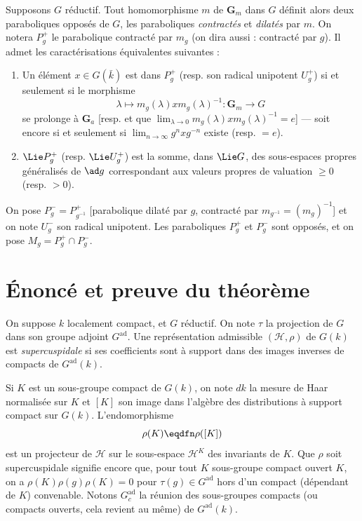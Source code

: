 Supposons \(G\) réductif. Tout homomorphisme \(m\) de \(\mathbf{G}_m\) dans
\(G\) définit alors deux paraboliques opposés de \(G\), les paraboliques
\emph{contractés} et \emph{dilatés} par \(m\). On notera \(P_g^{+}\) le
parabolique contracté par \(m_g\) (on dira aussi : contracté par \(g\)). Il
admet les caractérisations équivalentes suivantes :

\begin{enumerate}[label=(\alph*)]
\item Un élément \(x\in G(\bar{k})\) est dans \(P_g^{+}\) (resp. son radical
  unipotent \(U_g^{+}\)) si et seulement si le morphisme
  \[
    \lambda\longmapsto m_g(\lambda)x m_g(\lambda)^{-1}:
    \mathbf{G}_m\longrightarrow G
  \]
  se prolonge à \(\mathbf{G}_a\) [resp. et que
  \(\lim_{\lambda\to0}m_g(\lambda)x m_g(\lambda)^{-1}=e\)] --- soit encore
  si et seulement si \(\lim_{n\to\infty}g^n xg^{-n}\) existe (resp. \(=e\)).

\item \(\Lie P_g^{+}\) (resp. \(\Lie U_g^{+}\)) est la somme, dans
  \(\Lie G\), des sous-espaces propres généralisés de \(\ad g\)
  correspondant aux valeurs propres de valuation \(\geq0\) (resp. \(>0\)).
\end{enumerate}

On pose \(P_g^{-}=P_{g^{-1}}^{+}\) [parabolique dilaté par \(g\), contracté
par \(m_{g^{-1}}=(m_g)^{-1}\)] et on note \(U_g^{-}\) son radical unipotent.
Les paraboliques \(P_g^{+}\) et \(P_g^{-}\) sont opposés, et on pose
\(M_g=P_g^{+}\cap P_g^{-}\).

\section{Énoncé et preuve du théorème}

On suppose \(k\) localement compact, et \(G\) réductif. On note \(\tau\) la
projection de \(G\) dans son groupe adjoint \(G^{\mathrm{ad}}\). Une
représentation admissible \((\mathscr{H},\rho)\) de
\(G(k)\) est \emph{supercuspidale} si ses coefficients sont à support dans
des images inverses de compacts de \(G^{\mathrm{ad}}(k)\).

Si \(K\) est un sous-groupe compact de \(G(k)\), on note \(dk\) la mesure de
Haar normalisée sur \(K\) et \([K]\) son image dans l'algèbre des distributions
à support compact sur \(G(k)\). L'endomorphisme
\[
  \rho(K)\eqdfn\rho([K])
\]
est un projecteur de \(\mathscr{H}\) sur le sous-espace \(\mathscr{H}^{K}\)
des invariants de \(K\). Que \(\rho\) soit supercuspidale signifie encore que,
pour tout \(K\) sous-groupe compact ouvert \(K\), on a
\(\rho(K)\rho(g)\rho(K)=0\) pour \(\tau(g)\in G^{\mathrm{ad}}\) hors d'un
compact (dépendant de \(K\)) convenable. Notons \(G_c^{\mathrm{ad}}\) la
réunion des sous-groupes compacts (ou compacts ouverts, cela revient au même)
de \(G^{\mathrm{ad}}(k)\).

